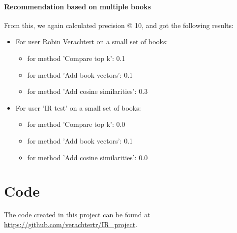 \documentclass[10pt,a4paper]{paper}
\begin{document}
\paragraph{Recommendation based on multiple books}

From this, we again calculated precision @ 10, and got the following results:
\begin{itemize}
\item For user Robin Verachtert on a small set of books:
\begin{itemize}
\item for method 'Compare top k': 0.1
\item for method 'Add book vectors': 0.1
\item for method 'Add cosine similarities': 0.3
\end{itemize}
\item For user 'IR test' on a small set of books:
\begin{itemize}
\item for method 'Compare top k': 0.0
\item for method 'Add book vectors': 0.1
\item for method 'Add cosine similarities': 0.0
\end{itemize}
\end{itemize}

\section{Code}
The code created in this project can be found at \url{https://github.com/verachtertr/IR_project}.
\end{document}
